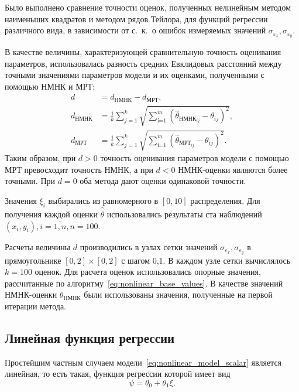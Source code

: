 Было выполнено сравнение точности оценок,
полученных нелинейным методом наименьших квадратов и методом рядов Тейлора,
для функций регрессии различного вида,
в зависимости от с.~к.~о ошибок измеряемых значений
\( \sigma_{\varepsilon_x}, \sigma_{\varepsilon_y} \).

В качестве величины, характеризующей сравнительную точность оценивания параметров,
использовалась разность средних Евклидовых расстояний
между точными значениями параметров модели и их оценками, полученными
с помощью НМНК и МРТ:
\begin{equation}
  \begin{aligned}
    d &= d_{\text{НМНК}} - d_{\text{МРТ}}, \\
    d_{\text{НМНК}} &=
    \frac{1}{k} \sum_{j=1}^k
    \sqrt{\sum_{\text{i=1}}^m (\hat{\theta}_{\text{НМНК}_{ij}} - \theta_{ij})^2}, \\
    d_{\text{МРТ}} &=
    \frac{1}{k} \sum_{j=1}^k
    \sqrt{\sum_{\text{i=1}}^m (\hat{\theta}_{\text{МРТ}_{ij}} - \theta_{ij})^2}.
  \end{aligned}
  \label{eq:dst_nonlinear_param}
\end{equation}
Таким образом, при \( d > 0 \) точность оценивания параметров модели с помощью МРТ
превосходит точность НМНК, а при \( d < 0 \) НМНК-оценки являются более точными.
При \( d = 0 \) оба метода дают оценки одинаковой точности.

Значения \( \xi_i \) выбирались из равномерного в \( [0, 10] \) распределения.
Для получения каждой оценки \( \hat{\overline{\theta}} \) использовались результаты
ста наблюдений \( ( x_i, y_i ), i = \overline{1, n}, n = 100 \).

Расчеты величины \( d \) производились в узлах сетки значений
\( \sigma_{\varepsilon_x}, \sigma_{\varepsilon_y} \) в прямоугольнике
\( [0, 2] \times [0, 2] \) с шагом 0{,}1.
В каждом узле сетки вычислялось \( k = 100 \) оценок.
Для расчета оценок использовались опорные значения,
рассчитанные по алгоритму~\eqref{eq:nonlinear_base_values}.
В качестве значений НМНК-оценки \( \theta_{\text{НМНК}} \)
были использованы значения, полученные на первой итерации метода.

\pagebreak
\subsection{Линейная функция регрессии}

Простейшим частным случаем модели~\eqref{eq:nonlinear_model_scalar} является линейная,
то есть такая, функция регрессии которой имеет вид
\[ \psi = \theta_0 + \theta_1 \xi. \]

